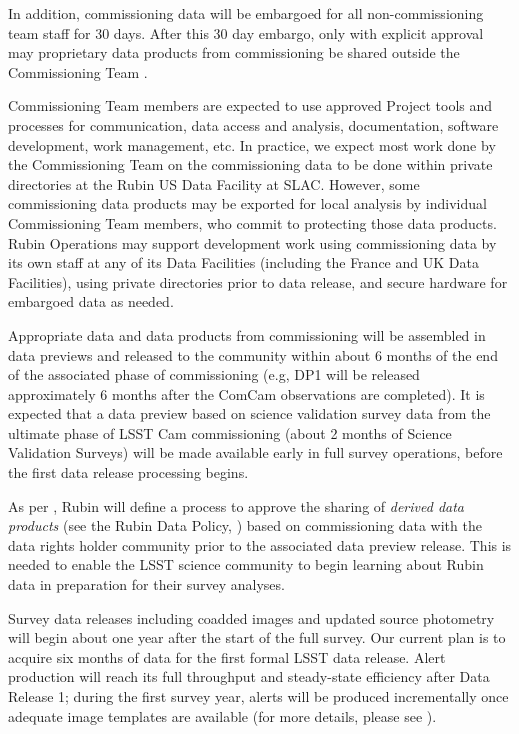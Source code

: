 In addition, commissioning data will be embargoed for all non-commissioning team staff for 30 days.
After this 30 day embargo, only with explicit approval may proprietary data products from commissioning be shared outside the Commissioning Team   .

Commissioning Team members are expected to use approved Project tools and processes for communication, data access and analysis, documentation, software development, work management, etc.
In practice, we expect most work done by the Commissioning Team on the commissioning data to be done within private directories at the Rubin US Data Facility at SLAC.
However, some commissioning data products may be exported for local analysis by individual Commissioning Team members, who commit to protecting those data products.
Rubin Operations may support development work using commissioning data by its own staff at any of its Data Facilities (including the France and UK Data Facilities), using private directories prior to data release, and secure hardware for embargoed data as needed.

Appropriate data and data products from commissioning will be assembled in data previews  and released to the community within about 6 months of the end of the associated phase of commissioning (e.g, DP1 will be released approximately 6 months after the ComCam observations are completed).
It is expected that a data preview based on science validation survey data from the ultimate phase of LSST Cam commissioning (about 2 months of Science Validation Surveys) will be made available early in full survey operations, before the first data release processing begins.

As per , Rubin will define a process to approve the sharing of {\it derived data products} (see the Rubin Data Policy, ) based on commissioning data with the data rights holder community prior to the associated data preview release.
This is needed to enable the LSST science community to begin learning about Rubin data in preparation for their survey analyses.

Survey data releases including coadded images and updated source photometry will begin about one year after the start of the full survey.
Our current plan is to acquire six months of data for the first formal LSST data release.
Alert production will reach its full throughput and steady-state efficiency after Data Release 1; during the first survey year, alerts will be produced incrementally once adequate image templates are available (for more details, please see ).
